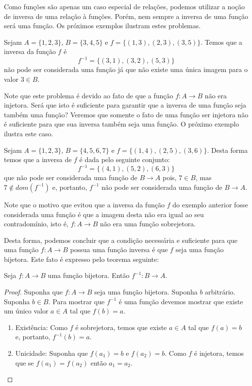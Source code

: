 Como funções são apenas um caso especial de relações, podemos utilizar
a noção de inversa de uma relação à funções. Porém, nem sempre a
inversa de uma função será uma função. Os próximos exemplos ilustram
estes problemas.

\begin{Example}
Sejam $A =\{1,2,3\}$, $B=\{3,4,5\}$ e $f
=\{(1,3),(2,3),(3,5)\}$. Temos que a inversa da função $f$ é
\[
f^{-1} = \{(3,1),(3,2),(5,3)\}
\]
não pode ser considerada uma função já que não existe uma única imagem
para o valor $3 \in B$.
\end{Example}
Note que este problema é devido ao fato de que a função $f : A \to B$
não era injetora. Será que isto é suficiente para garantir que a
inversa de uma função seja também uma função?  Veremos que somente o
fato de uma função ser injetora não é suficiente para que sua inversa
também seja uma função. O próximo exemplo ilustra este caso.
\begin{Example}
Sejam $A =\{1,2,3\}$, $B=\{4,5,6,7\}$ e
$f=\{(1,4),(2,5),(3,6)\}$. Desta forma temos que a inversa de  $f$ é
dada pelo seguinte conjunto:
\[
f^{-1}=\{(4,1),(5,2),(6,3)\}
\]
que não pode ser considerada uma função de $B \to A$ pois, $7 \in B$,
mas $7 \not\in dom(f^{-1})$ e, portanto, $f^{-1}$ não pode ser
considerada uma função de $B \to A$.
\end{Example}
Note que o motivo que evitou que a inversa da função $f$ do exemplo
anterior fosse considerada uma função é que a imagem desta não era
igual ao seu contradomínio, isto é, $f : A \to B$ não era uma função
sobrejetora.

Desta forma, podemos concluir que a condição necessária e suficiente
para que uma função $f : A \to B$ possua uma função inversa é que $f$
seja uma função bijetora. Este fato é expresso pelo teorema seguinte:
\begin{Theorem}
Seja $f : A \to B$ uma função bijetora. Então $f^{-1} : B \to A$.
\end{Theorem}
\begin{proof}
  Suponha que $f : A \to B$ seja uma função bijetora. Suponha $b$
  arbitrário. Suponha $b \in B$. Para mostrar que $f^{-1}$ é uma
  função devemos mostrar que existe um único valor $a \in A$ tal que
  $f(b) =a$.
  \begin{enumerate}
    \item Existência: Como $f$ é sobrejetora, temos que existe $a \in
      A$ tal que $f(a) = b$ e, portanto, $f^{-1}(b) = a$.
    \item Unicidade: Suponha que $f(a_1) = b$ e $f(a_2) = b$. Como $f$
      é injetora, temos que se $f(a_1) = f(a_2)$ então $a_1 = a_2$.
  \end{enumerate}
\end{proof}

